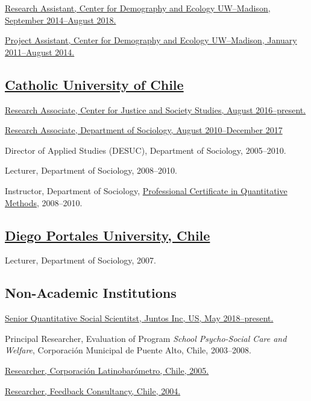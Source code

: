 \documentclass[10pt,letterpaper]{article}
\renewenvironment{itemize}{
  \begin{list}{}{
    \setlength{\leftmargin}{1.5em}
    \setlength{\itemsep}{0.25em}
    \setlength{\parskip}{0pt}
    \setlength{\parsep}{0.25em}
  }
}{
  \end{list}
}
\begin{document}
\begin{itemize}
\item \href{http://www.ssc.wisc.edu/cde/people/grads.php}{Research Assistant, Center for Demography and Ecology UW--Madison, September 2014--August 2018.}
\item \href{http://www.ssc.wisc.edu/cde/people/grads.php}{Project Assistant, Center for Demography and Ecology UW--Madison, January 2011--August 2014.}
\end{itemize}

\subsection*{\href{http://sociologia.uc.cl/}{Catholic University of Chile}}
 \begin{itemize}
 \item \href{http://justiciaysociedad.uc.cl/nosotros/investigadores-asociados}{Research Associate, Center for Justice and Society Studies, August 2016--present.}
 \item \href{http://sociologia.uc.cl/desuc}{Research Associate, Department of Sociology, August 2010--December 2017}
 \item Director of Applied Studies (DESUC), Department of Sociology, 2005--2010.
 \item Lecturer, Department of Sociology, 2008--2010.
 \item Instructor, Department of Sociology, \href{http://www.educacioncontinua.uc.cl}{Professional Certificate in Quantitative Methods}, 2008--2010.
 \end{itemize}

\subsection*{\href{http://www.udp.cl/facultades_carreras/ciencias_sociales-historia/}{Diego Portales University, Chile}}

\begin{itemize}
\item Lecturer, Department of Sociology, 2007.
\end{itemize}

\subsection*{Non-Academic Institutions}

\begin{itemize}
\item \href{http://juntosglobal.com/}{Senior Quantitative Social Scientitst, Juntos Inc, US, May 2018--present.}
\item Principal Researcher, Evaluation of Program \textit{School Psycho-Social Care and Welfare}, Corporación Municipal de Puente Alto, Chile, 2003--2008.
\item \href{http://www.latinobarometro.org}{Researcher, Corporación Latinobarómetro, Chile, 2005.}
\item \href{http://www.feedback.cl}{Researcher, Feedback Consultancy, Chile, 2004.}
\end{itemize}
\end{document}
